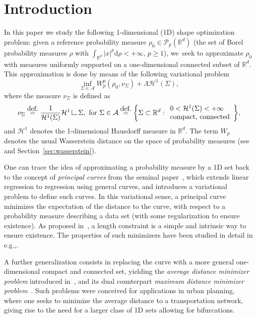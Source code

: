 \documentclass[11pt]{article}
\newcommand{\eg}{e.g.,\xspace}
\numberwithin{equation}{section}
\theoremstyle{definition}
\newcommand{\eqdef}{\ensuremath{\stackrel{\mbox{\upshape\tiny def.}}{=}}}
\newcommand\LM[1]{\hbox{\vrule width.5pt \vbox to#1pt{\vfill \hrule width#1pt height.5pt}}}
\newcommand\LL{{\mathchoice {\>\LM7\>}{\>\LM7\>}{\,\LM5\,}{\,\LM{3.35}\,}}}
\newcommand{\mres}{\LL}
\newcommand\cH{\mathcal{H}}
\newcommand{\RR}{\mathbb{R}}
\newcommand\dd{\mathrm{d}}
\begin{document}
\section{Introduction}\label{section.introduction}
In this paper we study the following 1-dimensional (1D) shape optimization
problem: given a reference probability measure
$\rho_0 \in \mathcal{P}_p(\RR^d)$ (the set of
Borel probability measures $\rho$ with $\int_{\RR^d}|x|^p \dd \rho<+\infty$, $p\ge 1$), we~seek to approximate $\rho_0$ with measures uniformly supported on a one-dimensional connected subset of $\RR^d$.
This approximation is done by means of the following variational problem
\begin{equation}
\label{problem.shape_optimization}
\tag{$P_\Lambda$}
\inf_{\Sigma \in \mathcal{A}}
W_p^p(\rho_0, \nu_{\Sigma}) + \Lambda \cH^1(\Sigma),
\end{equation}
where the measure $\nu_{\Sigma}$ is defined as
\begin{equation}\label{admissible_set}
\nu_{\Sigma} \eqdef \frac{1}{\cH^1(\Sigma)} \cH^1\mres \Sigma, \text{ for } \Sigma \in
\mathcal{A}\eqdef
\biggl\{
\Sigma \subset \RR^d :
\begin{array}{l}
0 < \mathcal{H}^1(\Sigma) < +\infty \\
\text{compact, connected}
\end{array}
\biggr\},
\end{equation}
and $\mathcal{H}^1$ denotes the 1-dimensional Hausdorff measure in $\RR^d$. The term $W_p$ denotes the usual Wasserstein distance on the space of probability measures (see~\cite{santambrogio2015optimal,villani2009optimal}
and Section~\ref{sec:wasserstein}).

One can trace the idea of approximating a probability measure by a 1D set back to the concept of \textit{principal curves} from the seminal paper~\cite{hastie1989principal}, which extends linear regression to regression using general curves, and introduces a variational problem to define such curves.
In this variational sense, a principal curve minimizes the expectation of the distance to the curve, with respect to a probability measure describing a data set (with some regularization to ensure existence). As proposed in~\cite{kegl2000learning}, a length constraint is a simple and intrinsic way to ensure existence. The properties of such minimizers have been studied in detail in \eg \cite{lu2016average,delattre2020principal}.

A further generalization consists in replacing the curve with a more general one-dimensional compact and connected set, yielding the \textit{average distance minimizer problem} introduced in~\cite{buttazzo2003optimal}, and its dual counterpart \textit{maximum distance minimizer problem}~\cite{paolini2004qualitative,lemenant2010presentation}. Such problems were conceived for applications in urban planning, where one seeks to minimize the average distance to a transportation network, giving rise to the need for a larger class of 1D sets allowing for bifurcations.
\end{document}
